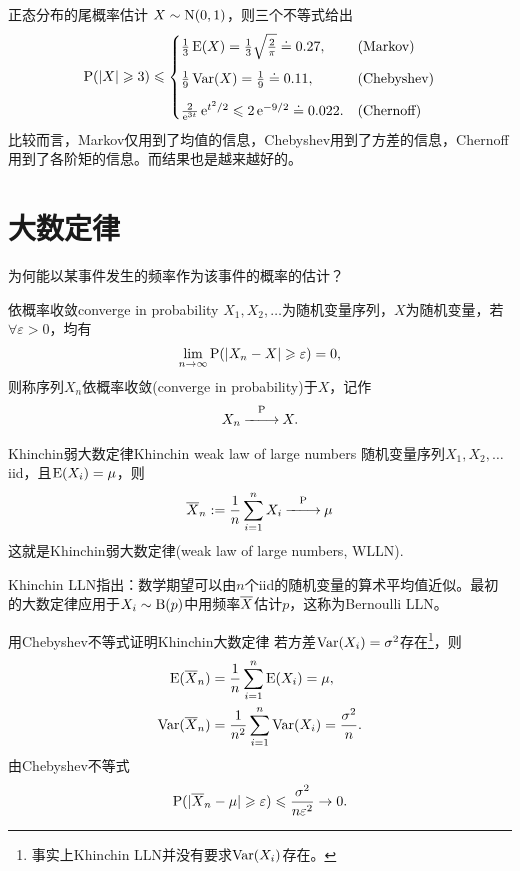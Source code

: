 \begin{example}{正态分布的尾概率估计}{}
	$X\sim\Norm(0,1)$，则三个不等式给出
	\begin{align*}
		\P(|X|\geqslant 3)\leqslant\begin{cases}
			\frac13\E(X)=\frac13\sqrt{\frac2\pi}\doteq 0.27,&\text{(Markov)}\\[2ex]
			\frac19\Var(X)=\frac19\doteq 0.11,&\text{(Chebyshev)}\\[2ex]
			\frac{2}{\e{3t}}\e{t^2/2}\leqslant 2\e{-9/2}\doteq 0.022.&\text{(Chernoff)}
		\end{cases}
	\end{align*}
	比较而言，Markov仅用到了均值的信息，Chebyshev用到了方差的信息，Chernoff用到了各阶矩的信息。而结果也是越来越好的。
\end{example}
\section{大数定律}
为何能以某事件发生的频率作为该事件的概率的估计？
\begin{definition}{依概率收敛}{converge in probability}
	$X_1,X_2,\ldots$为随机变量序列，$X$为随机变量，若$\forall\varepsilon>0$，均有
	\[
		\lim_{n\to\infty}\P(|X_n-X|\geqslant\varepsilon)=0,
	\]
	则称序列$X_n$依概率收敛(converge in probability)于$X$，记作
	\begin{align}
		X_n\pto X.
	\end{align}
\end{definition}
\begin{theorem}{Khinchin弱大数定律}{Khinchin weak law of large numbers}
	随机变量序列$X_1,X_2,\ldots$ iid，且$\E(X_i)=\mu$，则
	\begin{align}
		\avg X_n:=\frac1n\sum_{i=1}^nX_i\pto\mu
	\end{align}
	这就是Khinchin弱大数定律(weak law of large numbers, WLLN).
\end{theorem}
Khinchin LLN指出：数学期望可以由$n$个iid的随机变量的算术平均值近似。最初的大数定律应用于$X_i\sim\Bern(p)$中用频率$\avg X$估计$p$，这称为Bernoulli LLN。

\begin{example}{用Chebyshev不等式证明Khinchin大数定律}{}
	若方差$\Var(X_i)=\sigma^2$存在\footnote{事实上Khinchin LLN并没有要求$\Var(X_i)$存在。}，则
	\begin{align}
		\E(\avg X_n)&=\frac1n\sum_{i=1}^n\E(X_i)=\mu,\\
		\Var(\avg X_n)&=\frac1{n^2}\sum_{i=1}^n\Var(X_i)=\frac{\sigma^2}n.
	\end{align}
	由Chebyshev不等式
	\[
		\P(|\avg X_n-\mu|\geqslant\varepsilon)\leqslant\frac{\sigma^2}{n\varepsilon^2}\to 0.
	\]
\end{example}

